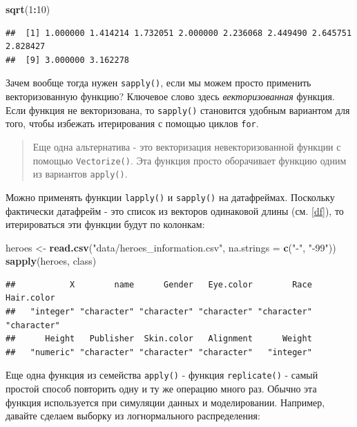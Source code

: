 \documentclass[
]{book}
\newenvironment{Shaded}{\begin{snugshade}}{\end{snugshade}}
\newcommand{\DataTypeTok}[1]{\textcolor[rgb]{0.13,0.29,0.53}{#1}}
\newcommand{\DecValTok}[1]{\textcolor[rgb]{0.00,0.00,0.81}{#1}}
\newcommand{\KeywordTok}[1]{\textcolor[rgb]{0.13,0.29,0.53}{\textbf{#1}}}
\newcommand{\NormalTok}[1]{#1}
\newcommand{\OperatorTok}[1]{\textcolor[rgb]{0.81,0.36,0.00}{\textbf{#1}}}
\newcommand{\StringTok}[1]{\textcolor[rgb]{0.31,0.60,0.02}{#1}}
\begin{document}
\begin{Shaded}
\begin{Highlighting}[]
\KeywordTok{sqrt}\NormalTok{(}\DecValTok{1}\OperatorTok{:}\DecValTok{10}\NormalTok{)}
\end{Highlighting}
\end{Shaded}

\begin{verbatim}
##  [1] 1.000000 1.414214 1.732051 2.000000 2.236068 2.449490 2.645751 2.828427
##  [9] 3.000000 3.162278
\end{verbatim}

Зачем вообще тогда нужен \texttt{sapply()}, если мы можем просто применить векторизованную функцию? Ключевое слово здесь \emph{векторизованная} функция. Если функция не векторизована, то \texttt{sapply()} становится удобным вариантом для того, чтобы избежать итерирования с помощью циклов \texttt{for}.

\begin{quote}
Еще одна альтернатива - это векторизация невекторизованной функции с помощью \texttt{Vectorize()}. Эта функция просто оборачивает функцию одним из вариантов \texttt{apply()}.
\end{quote}

Можно применять функции \texttt{lapply()} и \texttt{sapply()} на датафреймах. Поскольку фактически датафрейм - это список из векторов одинаковой длины (см. \ref{df}), то итерироваться эти функции будут по колонкам:

\begin{Shaded}
\begin{Highlighting}[]
\NormalTok{heroes <-}\StringTok{ }\KeywordTok{read.csv}\NormalTok{(}\StringTok{"data/heroes_information.csv"}\NormalTok{, }
                   \DataTypeTok{na.strings =} \KeywordTok{c}\NormalTok{(}\StringTok{"-"}\NormalTok{, }\StringTok{"-99"}\NormalTok{))}
\KeywordTok{sapply}\NormalTok{(heroes, class)}
\end{Highlighting}
\end{Shaded}

\begin{verbatim}
##           X        name      Gender   Eye.color        Race  Hair.color 
##   "integer" "character" "character" "character" "character" "character" 
##      Height   Publisher  Skin.color   Alignment      Weight 
##   "numeric" "character" "character" "character"   "integer"
\end{verbatim}

Еще одна функция из семейства \texttt{apply()} - функция \texttt{replicate()} - самый простой способ повторить одну и ту же операцию много раз. Обычно эта функция используется при симуляции данных и моделировании. Например, давайте сделаем выборку из логнормального распределения:
\end{document}
